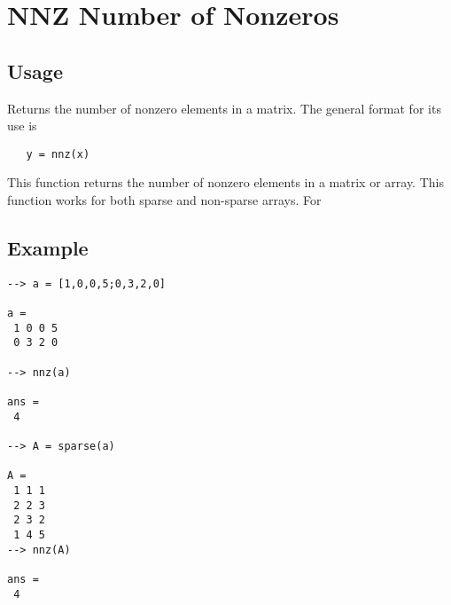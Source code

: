 \section{NNZ Number of Nonzeros
}

\subsection{Usage}

Returns the number of nonzero elements in a matrix.
The general format for its use is
\begin{verbatim}
   y = nnz(x)
\end{verbatim}
This function returns the number of nonzero elements
in a matrix or array.  This function works for both
sparse and non-sparse arrays.  For 
\subsection{Example}

\begin{verbatim}
--> a = [1,0,0,5;0,3,2,0]

a = 
 1 0 0 5 
 0 3 2 0 

--> nnz(a)

ans = 
 4 

--> A = sparse(a)

A = 
 1 1 1
 2 2 3
 2 3 2
 1 4 5
--> nnz(A)

ans = 
 4 
\end{verbatim}
